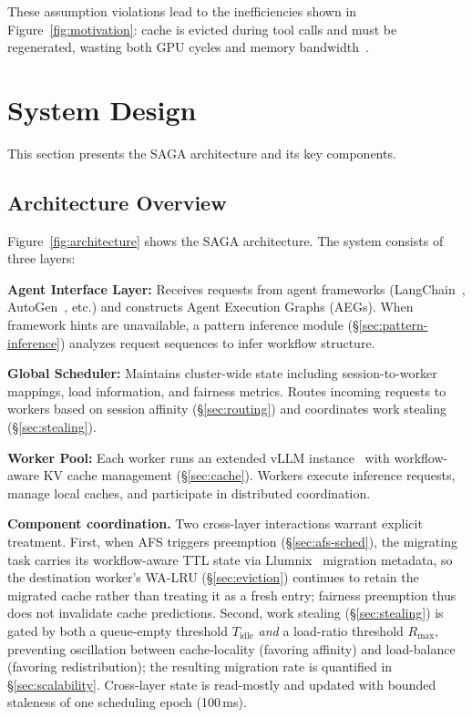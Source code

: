 \documentclass[sigconf]{acmart}
\newcommand{\sysname}{SAGA\xspace}
\begin{document}
These assumption violations lead to the inefficiencies shown in Figure~\ref{fig:motivation}: cache is evicted during tool calls and must be regenerated, wasting both GPU cycles and memory bandwidth~\cite{xiao2024efficient}.

\section{System Design}
\label{sec:design}

This section presents the \sysname architecture and its key components.

\subsection{Architecture Overview}
\label{sec:arch}

Figure~\ref{fig:architecture} shows the \sysname architecture. The system consists of three layers:

\textbf{Agent Interface Layer:} Receives requests from agent frameworks (LangChain~\cite{langchain2024}, AutoGen~\cite{wu2024autogen}, etc.) and constructs Agent Execution Graphs (AEGs). When framework hints are unavailable, a pattern inference module (\S\ref{sec:pattern-inference}) analyzes request sequences to infer workflow structure.

\textbf{Global Scheduler:} Maintains cluster-wide state including session-to-worker mappings, load information, and fairness metrics. Routes incoming requests to workers based on session affinity (\S\ref{sec:routing}) and coordinates work stealing (\S\ref{sec:stealing}).

\textbf{Worker Pool:} Each worker runs an extended vLLM instance~\cite{kwon2023vllm} with workflow-aware KV cache management (\S\ref{sec:cache}). Workers execute inference requests, manage local caches, and participate in distributed coordination.

\textbf{Component coordination.} Two cross-layer interactions warrant explicit treatment. First, when AFS triggers preemption (\S\ref{sec:afs-sched}), the migrating task carries its workflow-aware TTL state via Llumnix~\cite{sun2024llumnix} migration metadata, so the destination worker's WA-LRU (\S\ref{sec:eviction}) continues to retain the migrated cache rather than treating it as a fresh entry; fairness preemption thus does not invalidate cache predictions. Second, work stealing (\S\ref{sec:stealing}) is gated by both a queue-empty threshold $T_\text{idle}$ \emph{and} a load-ratio threshold $R_\text{max}$, preventing oscillation between cache-locality (favoring affinity) and load-balance (favoring redistribution); the resulting migration rate is quantified in \S\ref{sec:scalability}. Cross-layer state is read-mostly and updated with bounded staleness of one scheduling epoch (100\,ms).
\end{document}
